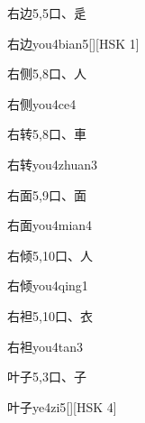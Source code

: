 \begin{entry}{右边}{5,5}{⼝、⾡}
  \begin{phonetics}{右边}{you4bian5}[][HSK 1]
  \end{phonetics}
\end{entry}

\begin{entry}{右侧}{5,8}{⼝、⼈}
  \begin{phonetics}{右侧}{you4ce4}
  \end{phonetics}
\end{entry}

\begin{entry}{右转}{5,8}{⼝、⾞}
  \begin{phonetics}{右转}{you4zhuan3}
  \end{phonetics}
\end{entry}

\begin{entry}{右面}{5,9}{⼝、⾯}
  \begin{phonetics}{右面}{you4mian4}
  \end{phonetics}
\end{entry}

\begin{entry}{右倾}{5,10}{⼝、⼈}
  \begin{phonetics}{右倾}{you4qing1}
  \end{phonetics}
\end{entry}

\begin{entry}{右袒}{5,10}{⼝、⾐}
  \begin{phonetics}{右袒}{you4tan3}
  \end{phonetics}
\end{entry}

\begin{entry}{叶子}{5,3}{⼝、⼦}
  \begin{phonetics}{叶子}{ye4zi5}[][HSK 4]
  \end{phonetics}
\end{entry}

